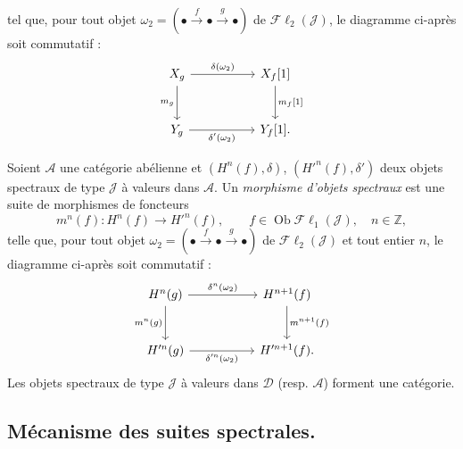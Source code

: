 \clearpage
{}%
\begingroup\small\setlength{\parskip}{0pt}\setlength{\emergencystretch}{1.5em}
tel que, pour tout objet
$\omega_2=(\mathord\bullet\xrightarrow f\mathord\bullet\xrightarrow g\mathord\bullet)$
de $\mathcal{F}\ell_2(\mathcal J)$, le diagramme ci-après soit commutatif :
\[
\begin{tikzcd}[column sep=5.2em,row sep=2.7em]
X_g\arrow[r,"{\delta(\omega_2)}"]\arrow[d,"{m_g}"']&X_f[1]\arrow[d,"{m_f[1]}"]\\
Y_g\arrow[r,"{\delta'(\omega_2)}"']&Y_f[1].
\end{tikzcd}
\]

Soient $\mathcal A$ une catégorie abélienne et $(H^n(f),\delta)$,
$(H'^{n}(f),\delta')$ deux objets spectraux de type $\mathcal J$ à valeurs
dans $\mathcal A$. Un \emph{morphisme d'objets spectraux} est une suite de
morphismes de foncteurs
\[
m^n(f)\colon H^n(f)\longrightarrow H'^{n}(f),\qquad
f\in\operatorname{Ob}\mathcal{F}\ell_1(\mathcal J),\quad n\in\mathbb Z,
\]
telle que, pour tout objet
$\omega_2=(\mathord\bullet\xrightarrow f\mathord\bullet\xrightarrow g\mathord\bullet)$
de $\mathcal{F}\ell_2(\mathcal J)$ et tout entier $n$, le diagramme ci-après
soit commutatif :
\[
\begin{tikzcd}[column sep=5.2em,row sep=2.7em]
H^n(g)\arrow[r,"{\delta^n(\omega_2)}"]\arrow[d,"{m^n(g)}"']&
H^{n+1}(f)\arrow[d,"{m^{n+1}(f)}"]\\
H'^{n}(g)\arrow[r,"{\delta'^{n}(\omega_2)}"']&H'^{n+1}(f).
\end{tikzcd}
\]
Les objets spectraux de type $\mathcal J$ à valeurs dans $\mathcal D$
(resp. $\mathcal A$) forment une catégorie.

\subsection{Mécanisme des suites spectrales.}

